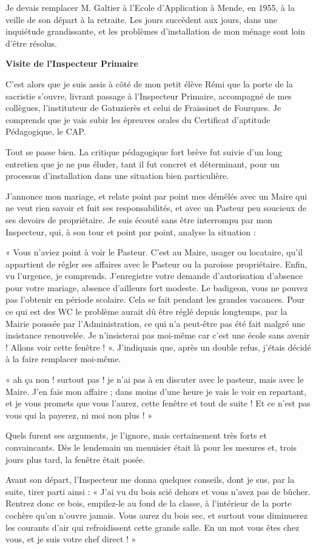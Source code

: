 
Je devais remplacer M. Galtier à l’Ecole d’Application à Mende, en 1955, à la veille de son
départ à la retraite. Les jours succèdent aux jours, dans une inquiétude grandissante, et les
problèmes d’installation de mon ménage sont loin d’être résolus.

\textbf{Visite de l’Inspecteur Primaire}

C’est alors que je suis assis à côté de mon petit élève Rémi que la porte de la sacristie s’ouvre,
livrant passage à l’Inspecteur Primaire, accompagné de mes collègues, l’instituteur de
Gatuzierès et celui de Fraissinet de Fourques. Je comprends que je vais subir les épreuves
orales du Certificat d’aptitude Pédagogique, le CAP.

Tout se passe bien. La critique pédagogique fort brève fut suivie d’un long entretien que je ne
pus éluder, tant il fut concret et déterminant, pour un processus d’installation dans une
situation bien particulière.

J’annonce mon mariage, et relate point par point mes démêlés avec un Maire qui ne veut rien
savoir et fuit ses responsabilités, et avec un Pasteur peu soucieux de ses devoirs de
propriétaire.
Je suis écouté sans être interrompu par mon Inspecteur, qui, à son tour et point par point,
analyse la situation :

« Vous n’aviez point à voir le Pasteur. C’est au Maire, usager ou locataire, qu’il appartient de
régler ses affaires avec le Pasteur ou la paroisse propriétaire. Enfin, vu l’urgence, je
comprends.
J’enregistre votre demande d’autorisation d’absence pour votre mariage, absence d’ailleurs
fort modeste. Le badigeon, vous ne pouvez pas l’obtenir en période scolaire. Cela se fait
pendant les grandes vacances. Pour ce qui est des WC le problème aurait dû être réglé depuis
longtemps, par la Mairie poussée par l’Administration, ce qui n’a peut-être pas été fait malgré
une insistance renouvelée. Je n’insisterai pas moi-même car c’est une école sans
avenir ! Allons voir cette fenêtre ! ».
J’indiquais que, après un double refus, j’étais décidé à la faire remplacer moi-même.

« ah ça non ! surtout pas ! je n’ai pas à en discuter avec le pasteur, mais avec le Maire. J’en
fais mon affaire ; dans moins d’une heure je vais le voir en repartant, et je vous promets que
vous l’aurez, cette fenêtre et tout de suite ! Et ce n’est pas vous qui la payerez, ni moi non
plus ! »

Quels furent ses arguments, je l’ignore, mais certainement très forts et convaincants. Dès le
lendemain un menuisier était là pour les mesures et, trois jours plus tard, la fenêtre était posée.

Avant son départ, l’Inspecteur me donna quelques conseils, dont je sus, par la suite, tirer
parti ainsi :
« J’ai vu du bois scié dehors et vous n’avez pas de bûcher. Rentrez donc ce bois, empilez-le
au fond de la classe, à l’intérieur de la porte cochère qu’on n’ouvre jamais. Vous aurez du bois
sec, et surtout vous diminuerez les courants d’air qui refroidissent cette grande salle. En un
mot vous êtes chez vous, et je suis votre chef direct ! »
